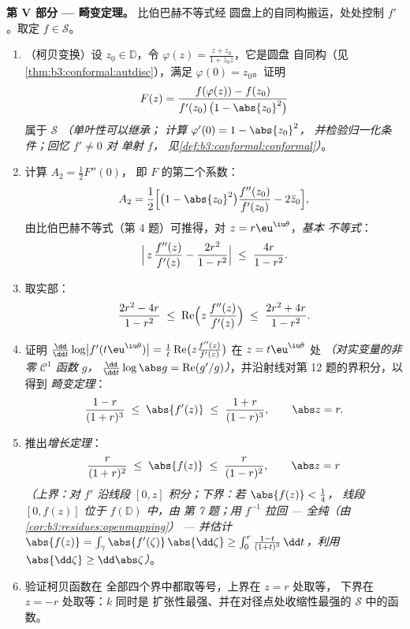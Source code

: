\begin{problem}
\medskip
\noindent\textbf{第 V 部分 --- 畸变定理。}
比伯巴赫不等式经
圆盘上的自同构搬运，处处控制 $f'$。取定 $f \in \mathcal
S$。
\begin{enumerate}[resume]
  \item （柯贝变换）设 $z_0 \in \mathbb D$，令
        $\varphi(z) = \frac{z + z_0}{1 + \bar z_0z}$，它是圆盘
        自同构（见\cref{thm:b3:conformal:autdisc}），满足
        $\varphi(0) = z_0$。证明
        \[
        F(z) = \frac{f(\varphi(z)) - f(z_0)}
        {f'(z_0)\,\bigl(1 - \abs{z_0}^2\bigr)}
        \]
        属于 $\mathcal S$ \emph{（单叶性可以继承；
        计算 $\varphi'(0) = 1 - \abs{z_0}^2$，
        并检验归一化条件；回忆 $f' \neq 0$ 对
        单射 $f$，
        见\cref{def:b3:conformal:conformal}）}。
  \item 计算 $A_2 = \frac12F''(0)$，
        即 $F$ 的第二个系数：
        \[
        A_2 = \frac12\Bigl[\bigl(1 - \abs{z_0}^2\bigr)
        \frac{f''(z_0)}{f'(z_0)} - 2\bar z_0\Bigr] ,
        \]
        由比伯巴赫不等式（第 4 题）可推得，对 $z =
        r\eu^{\iu\theta}$，\emph{基本
        不等式}：
        \[
        \Bigl|\,z\,\frac{f''(z)}{f'(z)} -
        \frac{2r^2}{1 - r^2}\Bigr|
        \;\leq\; \frac{4r}{1 - r^2} .
        \]
  \item 取实部：
        \[
        \frac{2r^2 - 4r}{1 - r^2} \;\leq\;
        \operatorname{Re}\Bigl(z\,\frac{f''(z)}{f'(z)}\Bigr)
        \;\leq\; \frac{2r^2 + 4r}{1 - r^2} .
        \]
  \item 证明 $\frac{\dd}{\dd t}\log\bigl|
        f'(t\eu^{\iu\theta})\bigr| = \frac1t
        \operatorname{Re}\bigl(z\frac{f''(z)}{f'(z)}\bigr)$
        在 $z = t\eu^{\iu\theta}$ 处 \emph{（对实变量的非零
        $\mathcal C^1$ 函数 $g$，
        $\frac{\dd}{\dd t}\log\abs g =
        \operatorname{Re}(g'/g)$）}，并沿射线对第
        12 题的界积分，以得到
        \emph{畸变定理}：
        \[
        \frac{1 - r}{(1 + r)^3} \;\leq\; \abs{f'(z)}
        \;\leq\; \frac{1 + r}{(1 - r)^3},
        \qquad \abs z = r .
        \]
  \item 推出\emph{增长定理}：
        \[
        \frac{r}{(1 + r)^2} \;\leq\; \abs{f(z)} \;\leq\;
        \frac{r}{(1 - r)^2},
        \qquad \abs z = r
        \]
        \emph{（上界：对 $f'$ 沿线段
        $[0, z]$ 积分；下界：若 $\abs{f(z)} < \frac14$，
        线段 $[0, f(z)]$ 位于 $f(\mathbb D)$ 中，由
        第 7 题；用 $f^{-1}$ 拉回 ---
        全纯（由
        \cref{cor:b3:residues:openmapping}） --- 并估计
        $\abs{f(z)} = \int_\gamma\abs{f'(\zeta)}
        \,\abs{\dd\zeta} \geq \int_0^r\frac{1 - t}{(1 +
        t)^3}\,\dd t$，利用 $\abs{\dd\zeta} \geq
        \dd\abs\zeta$）}。
  \item 验证柯贝函数在
        全部四个界中都取等号，上界在 $z = r$ 处取等，
        下界在 $z = -r$ 处取等：$k$ 同时是
        扩张性最强、并在对径点处收缩性最强的
        $\mathcal S$ 中的函数。
\end{enumerate}


\end{problem}
